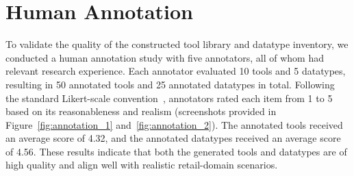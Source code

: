 \documentclass{llmxive}
\begin{document}
\section{Human Annotation}
\label{app:human-annotation}

To validate the quality of the constructed tool library and datatype inventory, we conducted a human annotation study with five annotators, all of whom had relevant research experience. 
Each annotator evaluated 10 tools and 5 datatypes, resulting in 50 annotated tools and 25 annotated datatypes in total. 
Following the standard Likert-scale convention~\citep{likert1932technique}, annotators rated each item from 1 to 5 based on its reasonableness and realism (screenshots provided in Figure~\ref{fig:annotation_1} and~\ref{fig:annotation_2}). The annotated tools received an average score of 4.32, and the annotated datatypes received an average score of 4.56. These results indicate that both the generated tools and datatypes are of high quality and align well with realistic retail-domain scenarios.
\end{document}

